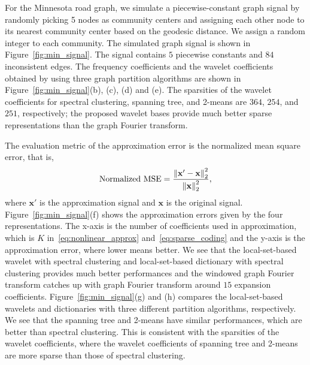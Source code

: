 \documentclass[journal,twocolumn,10pt]{IEEEtran}
\theoremstyle{definition}
\def\x{\mathbf{x}}
\begin{document}
For the Minnesota road graph, we simulate a piecewise-constant graph signal by randomly picking 5 nodes as community centers and assigning each other node to its nearest community center based on the geodesic distance. We assign a random integer to each community. The simulated graph signal is shown in Figure~\ref{fig:min_signal}. The signal contains $5$ piecewise constants and $84$ inconsistent edges. The frequency coefficients and the wavelet coefficients obtained by using three graph partition algorithms are shown in Figure~\ref{fig:min_signal}(b), (c), (d) and (e). The sparsities of the wavelet coefficients for spectral clustering, spanning tree, and 2-means are $364$, $254$, and $251$, respectively; the proposed wavelet bases provide much better sparse representations than the graph Fourier transform.

The evaluation metric of the approximation error is the normalized mean square error, that is,
\begin{equation*}
 {\rm Normalized~MSE} = \frac{ \left\|  \x' - \x \right\|_2^2 }{ \left\| \x \right\|_2^2 },
\end{equation*}
where $\x'$ is the approximation signal and $\x$ is the original signal. Figure~\ref{fig:min_signal}(f) shows the approximation errors given by the four representations. The x-axis is the number of coefficients used in approximation, which is $K$ in~\eqref{eq:nonlinear_approx} and~\eqref{eq:sparse_coding} and the y-axis is the approximation error, where lower means better.  We see that the local-set-based wavelet with spectral clustering and local-set-based dictionary with spectral clustering provides much better performances and the windowed graph Fourier transform catches up with graph Fourier transform around $15$ expansion coefficients. Figure~\ref{fig:min_signal}(g) and (h) compares the local-set-based wavelets and dictionaries with three different partition algorithms, respectively. We see that the spanning tree and 2-means have similar performances, which are better than spectral clustering. This is consistent with the sparsities of the wavelet coefficients, where the wavelet coefficients of spanning tree and 2-means are more sparse than those of spectral clustering.
\end{document}
